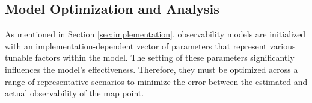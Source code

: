 \subsection{Model Optimization and Analysis}

As mentioned in Section \ref{sec:implementation}, observability models are initialized with an implementation-dependent vector of parameters that represent various tunable factors within the model. The setting of these parameters significantly influences the model's effectiveness. Therefore, they must be optimized across a range of representative scenarios to minimize the error between the estimated and actual observability of the map point. 

\subsubsection{}